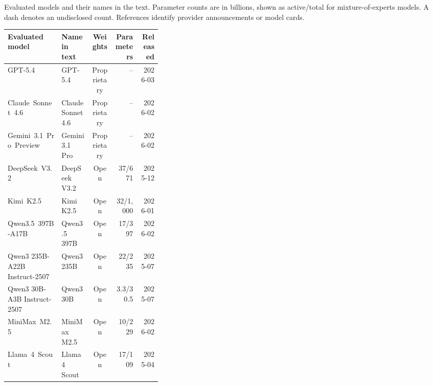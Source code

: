 \begin{tableorg}[!htbp]
\centering\small
\renewcommand{\tablecaptionfont}{\fontsize{9}{11}\selectfont}
\caption{Evaluated models and their names in the text.
Parameter counts are in billions, shown as active/total for mixture-of-experts models.
A dash denotes an undisclosed count.
References identify provider announcements or model cards.}
\label{tab:models}
\setlength{\tabcolsep}{2.8pt}
\renewcommand{\arraystretch}{1.15}
\begin{tabular}{@{}>{\raggedright\arraybackslash}p{0.35\linewidth}lcrr@{}}
\toprule
\textbf{Evaluated model} & \textbf{Name in text} & \textbf{Weights} & \textbf{Parameters} & \textbf{Released} \\
\midrule
\mbox{GPT-5.4} \mbox{\citep{openai_gpt54_2026}} & GPT-5.4 & Proprietary & -- & 2026-03 \\
\mbox{Claude Sonnet 4.6} \mbox{\citep{anthropic_sonnet46_2026}} & Claude Sonnet 4.6 & Proprietary & -- & 2026-02 \\
\mbox{Gemini 3.1 Pro Preview} \mbox{\citep{google_gemini31_2026}} & Gemini 3.1 Pro & Proprietary & -- & 2026-02 \\
\mbox{DeepSeek V3.2} \mbox{\citep{deepseek_v32_2025}} & DeepSeek V3.2 & Open & 37/671 & 2025-12 \\
\mbox{Kimi K2.5} \mbox{\citep{moonshot_kimi25_2026}} & Kimi K2.5 & Open & 32/1,000 & 2026-01 \\
\mbox{Qwen3.5 397B-A17B} \mbox{\citep{qwen35_397b_2026}} & Qwen3.5 397B & Open & 17/397 & 2026-02 \\
Qwen3 \mbox{235B-A22B} \mbox{Instruct-2507} \mbox{\citep{qwen3_235b_2025}} & Qwen3 235B & Open & 22/235 & 2025-07 \\
Qwen3 \mbox{30B-A3B} \mbox{Instruct-2507} \mbox{\citep{qwen3_30b_2025}} & Qwen3 30B & Open & 3.3/30.5 & 2025-07 \\
\mbox{MiniMax M2.5} \mbox{\citep{minimax_m25_2026}} & MiniMax M2.5 & Open & 10/229 & 2026-02 \\
\mbox{Llama 4 Scout} \mbox{\citep{meta_llama4_scout_2025}} & Llama 4 Scout & Open & 17/109 & 2025-04 \\
\bottomrule
\end{tabular}
\end{tableorg}
